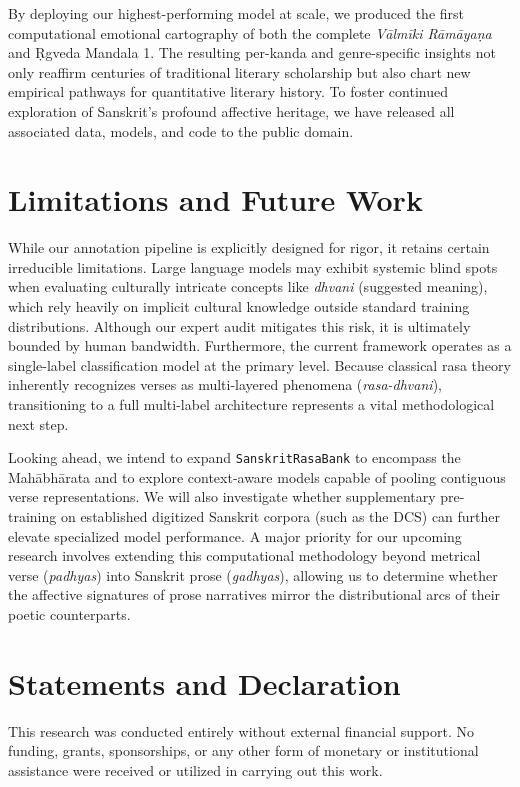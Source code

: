 \documentclass[11pt]{article}
\begin{document}
By deploying our highest-performing model at scale, we produced the first computational emotional cartography of both the complete \textit{V\=alm\=iki R\=am\=aya\d na} and \d Rgveda Mandala 1. The resulting per-kanda and genre-specific insights not only reaffirm centuries of traditional literary scholarship but also chart new empirical pathways for quantitative literary history. To foster continued exploration of Sanskrit's profound affective heritage, we have released all associated data, models, and code to the public domain.

\section{Limitations and Future Work}

While our annotation pipeline is explicitly designed for rigor, it retains certain irreducible limitations. Large language models may exhibit systemic blind spots when evaluating culturally intricate concepts like \textit{dhvani} (suggested meaning), which rely heavily on implicit cultural knowledge outside standard training distributions. Although our expert audit mitigates this risk, it is ultimately bounded by human bandwidth. Furthermore, the current framework operates as a single-label classification model at the primary level. Because classical rasa theory inherently recognizes verses as multi-layered phenomena (\textit{rasa-dhvani}), transitioning to a full multi-label architecture represents a vital methodological next step. 

Looking ahead, we intend to expand \texttt{SanskritRasaBank} to encompass the Mah\=abh\=arata and to explore context-aware models capable of pooling contiguous verse representations. We will also investigate whether supplementary pre-training on established digitized Sanskrit corpora (such as the DCS) can further elevate specialized model performance. A major priority for our upcoming research involves extending this computational methodology beyond metrical verse (\textit{padhyas}) into Sanskrit prose (\textit{gadhyas}), allowing us to determine whether the affective signatures of prose narratives mirror the distributional arcs of their poetic counterparts.

\section*{Statements and Declaration}

This research was conducted entirely without external financial support. No funding, grants, sponsorships, or any other form of monetary or institutional assistance were received or utilized in carrying out this work.
\end{document}
